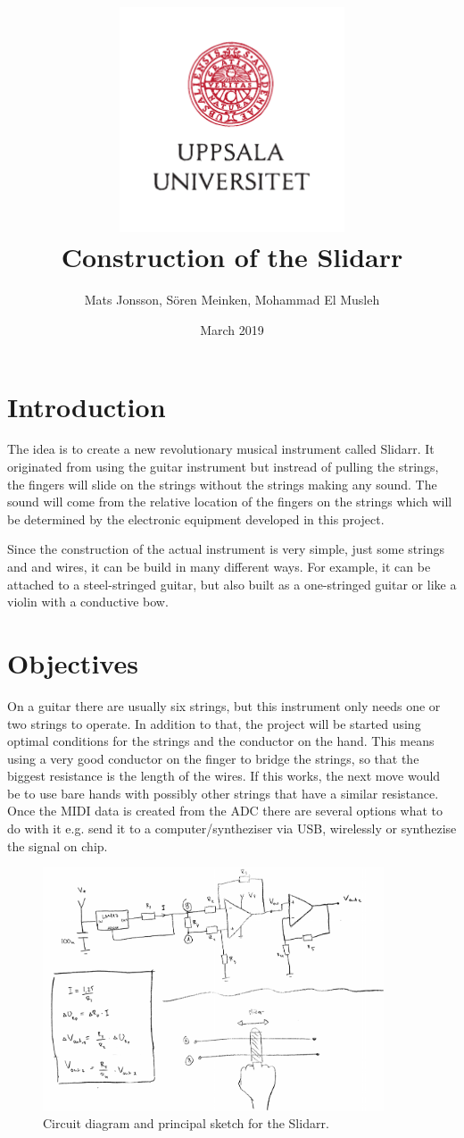 \documentclass{article}
\title{\includegraphics[width=0.5\textwidth]{UU_logo.pdf}\\
Construction of the Slidarr}
\author{Mats Jonsson, Sören Meinken, Mohammad El Musleh}
\date{March 2019}
\begin{document}
\maketitle

\section{Introduction}
The idea is to create a new revolutionary musical instrument called Slidarr. It originated from using the guitar instrument but instread of pulling the strings, the fingers will slide on the strings without the strings making any sound. The sound will come from the relative location of the fingers on the strings which will be determined by the electronic equipment developed in this project.

Since the construction of the actual instrument is very simple, just some strings and and wires, it can be build in many different ways. For example, it can be attached to a steel-stringed guitar, but also built as a one-stringed guitar or like a violin with a conductive bow.

\section{Objectives}
On a guitar there are usually six strings, but this instrument only needs one or two strings to operate. In addition to that, the project will be started using optimal conditions for the strings and the conductor on the hand. This means using a very good conductor on the finger to bridge the strings, so that the biggest resistance is the length of the wires. If this works, the next move would be to use bare hands with possibly other strings that have a similar resistance. Once the MIDI data is created from the ADC there are several options what to do with it e.g. send it to a computer/syntheziser via USB, wirelessly or synthezise the signal on chip.

\begin{figure}[h]
  \centering
  \includegraphics[width=0.9\textwidth]{circuit.png}
  \caption{Circuit diagram and principal sketch for the Slidarr.}
  \label{fig:circuit}
\end{figure}
\end{document}
